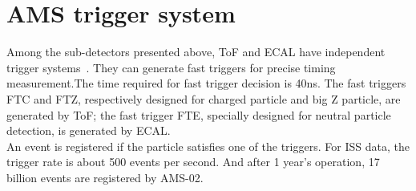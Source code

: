 \chapter{AMS trigger system}
Among the sub-detectors presented above, ToF and ECAL have independent trigger systems~\cite{triggerTwiki}. They can generate fast triggers for precise timing measurement.The time required for fast trigger decision is 40ns. The fast triggers FTC and FTZ, respectively designed for charged particle and big Z particle, are generated by ToF; the fast trigger FTE, specially designed for neutral particle detection, is generated by ECAL.\\
An event is registered if the particle satisfies one of the triggers. For ISS data, the trigger rate is about 500 events per second. And after 1 year's operation, 17 billion events are registered by AMS-02.